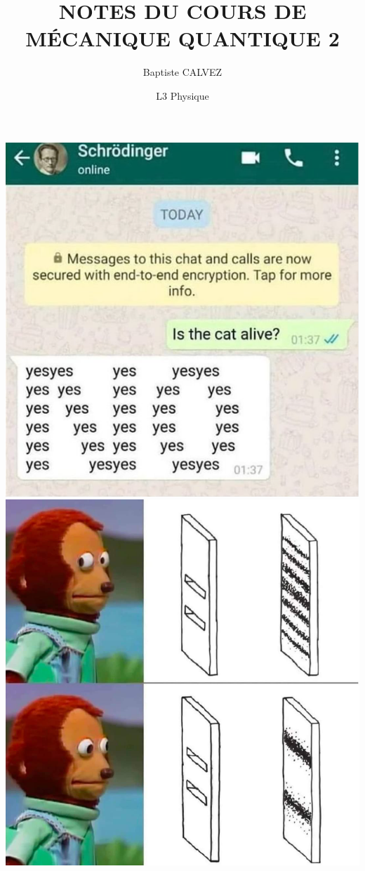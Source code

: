 \documentclass[12pt,a4paper,titlepage]{book}
\title{NOTES DU COURS DE MÉCANIQUE QUANTIQUE 2}
\author{Baptiste CALVEZ}
\date{L3 Physique}
\begin{document}
\maketitle
{}
\newpage
\null
\newpage
\begin{center}
\includegraphics[scale=0.5]{memereddit.png}
\includegraphics[scale=0.2]{memereddit2.png}
\end{center}
\end{document}
